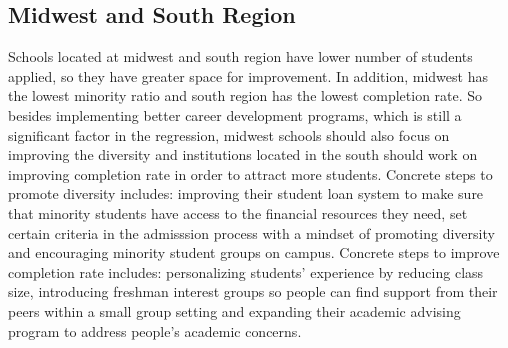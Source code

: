 \documentclass{article}
\begin{document}
\subsection{Midwest and South Region}
Schools located at midwest and south region have lower number of students applied, so they have greater space for improvement. In addition, midwest has the lowest minority ratio and south region has the lowest completion rate. So besides implementing better career development programs, which is still a significant factor in the regression, midwest schools should also focus on improving the diversity and institutions located in the south should work on improving completion rate in order to attract more students. Concrete steps to promote diversity includes: improving their student loan system to make sure that minority students have access to the financial resources they need, set certain criteria in the admisssion process with a mindset of promoting diversity and encouraging minority student groups on campus. Concrete steps to improve completion rate includes: personalizing students' experience by reducing class size, introducing freshman interest groups so people can find support from their peers within a small group setting and expanding their academic advising program to address people's academic concerns.  
\end{document}
